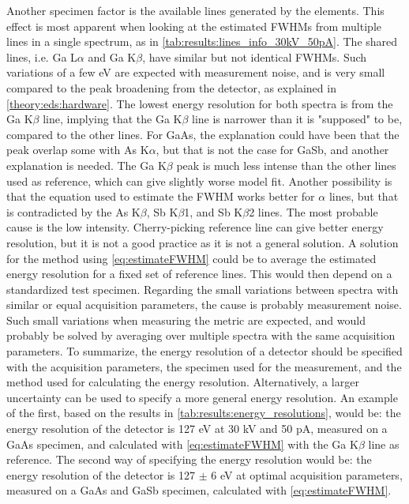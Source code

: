 Another specimen factor is the available lines generated by the elements.
This effect is most apparent when looking at the estimated FWHMs from multiple lines in a single spectrum, as in \cref{tab:results:lines_info_30kV_50pA}.
The shared lines, i.e. Ga L$\alpha$ and Ga K$\beta$, have similar but not identical FWHMs.
Such variations of a few eV are expected with measurement noise, and is very small compared to the peak broadening from the detector, as explained in \cref{theory:eds:hardware}.
The lowest energy resolution for both spectra is from the Ga K$\beta$ line, implying that the Ga K$\beta$ line is narrower than it is "supposed" to be, compared to the other lines.
For GaAs, the explanation could have been that the peak overlap some with As K$\alpha$, but that is not the case for GaSb, and another explanation is needed.
The Ga K$\beta$ peak is much less intense than the other lines used as reference, which can give slightly worse model fit.
Another possibility is that the equation used to estimate the FWHM works better for $\alpha$ lines, but that is contradicted by the As K$\beta$, Sb K$\beta$1, and Sb K$\beta$2 lines.
The most probable cause is the low intensity.
Cherry-picking reference line can give better energy resolution, but it is not a good practice as it is not a general solution.
A solution for the method using \cref{eq:estimateFWHM} could be to average the estimated energy resolution for a fixed set of reference lines.
This would then depend on a standardized test specimen.
Regarding the small variations between spectra with similar or equal acquisition parameters, the cause is probably measurement noise.
Such small variations when measuring the metric are expected, and would probably be solved by averaging over multiple spectra with the same acquisition parameters.
To summarize, the energy resolution of a detector should be specified with the acquisition parameters, the specimen used for the measurement, and the method used for calculating the energy resolution.
Alternatively, a larger uncertainty can be used to specify a more general energy resolution.
An example of the first, based on the results in \cref{tab:results:energy_resolutions}, would be:  the energy resolution of the detector is 127 eV at 30 kV and 50 pA, measured on a GaAs specimen, and calculated with \cref{eq:estimateFWHM} with the Ga K$\beta$ line as reference.
The second way of specifying the energy resolution would be: the energy resolution of the detector is 127 $\pm$ 6 eV at optimal acquisition parameters, measured on a GaAs and GaSb specimen, calculated with \cref{eq:estimateFWHM}.



